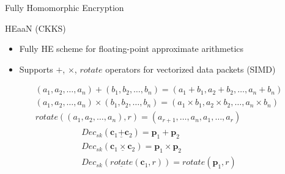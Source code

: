 \documentclass[9pt]{beamer}
\renewcommand{\vec}{\mathbf}
\begin{document}
\begin{frame}{Fully Homomorphic Encryption}
    \begin{block}{HEaaN (CKKS)}
        \begin{itemize}
            \item Fully HE scheme for \alert{floating-point approximate arithmetics}
            \item Supports $+$, $\times$, $rotate$ operators for vectorized data packets (SIMD)
        \end{itemize}
    \end{block}
    \begin{gather*}
        (a_1, a_2, \dots, a_n) + (b_1, b_2, \dots, b_n) = (a_1 + b_1, a_2 + b_2, \dots, a_n + b_n) \\
        (a_1, a_2, \dots, a_n) \times (b_1, b_2, \dots, b_n) = (a_1 \times b_1, a_2 \times b_2, \dots, a_n \times b_n) \\
        rotate((a_1, a_2, \dots, a_n), r) = (a_{r+1}, \dots, a_n, a_1, \dots, a_r)
    \end{gather*}
    \begin{gather*}
        Dec_{sk}(\vec c_1 \underline{+} \vec c_2) = \vec p_1 + \vec p_2 \\
        Dec_{sk}(\vec c_1 \underline{\times} \vec c_2) = \vec p_1 \times \vec p_2 \\
        Dec_{sk}(\underline{rotate}(\vec c_1, r)) = rotate(\vec p_1, r)
    \end{gather*}
\end{frame}
\end{document}
